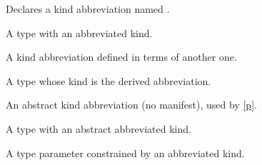\medbreak
\label{Oxcaml--kind-my_abbrev}\begin{ocamlindent}Declares a kind abbreviation named .\end{ocamlindent}%
\medbreak
\label{Oxcaml--type-t_abbrev}\begin{ocamlindent}A type with an abbreviated kind.\end{ocamlindent}%
\medbreak
\label{Oxcaml--kind-my_derived}\begin{ocamlindent}A kind abbreviation defined in terms of another one.\end{ocamlindent}%
\medbreak
\label{Oxcaml--type-t_derived}\begin{ocamlindent}A type whose kind is the derived abbreviation.\end{ocamlindent}%
\medbreak
\label{Oxcaml--kind-my_abstract}\begin{ocamlindent}An abstract kind abbreviation (no manifest), used by \hyperref[Oxcaml--type-t_abstract]{[p\pageref*{Oxcaml--type-t_abstract}]}.\end{ocamlindent}%
\medbreak
\label{Oxcaml--type-t_abstract}\begin{ocamlindent}A type with an abstract abbreviated kind.\end{ocamlindent}%
\medbreak
\label{Oxcaml--type-abbrev_param}\begin{ocamlindent}A type parameter constrained by an abbreviated kind.\end{ocamlindent}%
